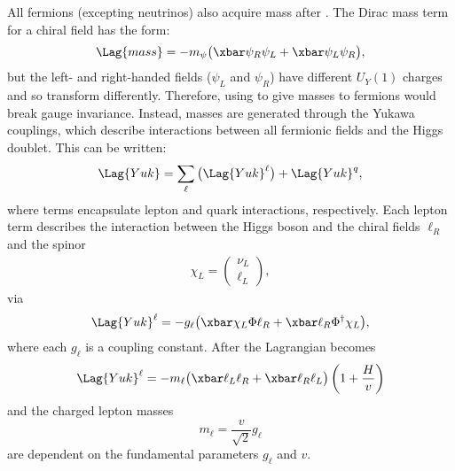 All fermions (excepting neutrinos) also acquire mass after \SSB.
The Dirac mass term for a chiral field has the form:
\begin{equation}
  \Lag{mass} = -m_\psi\big(\xbar\psi_R\psi_L + \xbar\psi_L\psi_R\big),
  \label{eq:diracmass}
\end{equation}
but the left- and right-handed fields
($\psi_L$ and $\psi_R$) have different $U_Y(1)$ charges and so transform differently.
Therefore, using  to give masses to fermions would break gauge invariance.
Instead, masses are generated through the Yukawa couplings, which
describe interactions between all fermionic fields and the Higgs doublet.
This can be written:
\begin{equation}
  \Lag{Yuk} = \sum_{\ell}\big(\Lag{Yuk}^\ell\big) + \Lag{Yuk}^q,
  \label{eq:th:yukking}
\end{equation}
where terms encapsulate lepton and quark interactions, respectively.
Each lepton term describes the interaction between the Higgs boson and the chiral fields
$\ell_R$ and the spinor
\begin{align}
  \chi_L = \begin{pmatrix}\nu_L \\ \ell_L \end{pmatrix},
\end{align}
via
\begin{equation}
  \Lag{Yuk}^\ell
  = - g_\ell\big(\xbar\chi_L\Phi \ell_R + \xbar \ell_R\Phi^\dagger\chi_L\big),
\end{equation}
where each $g_\ell$ is a coupling constant.
After \SSB the Lagrangian becomes
\begin{align}
  \Lag{Yuk}^\ell
  = - m_\ell \big(\xbar\ell_L\ell_R + \xbar\ell_R\ell_L\big)%
  \left(1 + \frac{H}{v}\right)
\end{align}
and the charged lepton masses
\begin{equation}
  m_\ell = \frac{v}{\sqrt{2}}g_\ell
  \label{eq:leptonmass}
\end{equation}
are dependent on the fundamental parameters $g_\ell$ and $v$.

